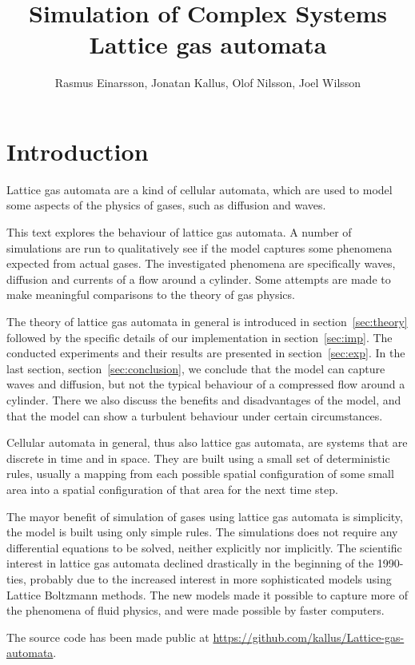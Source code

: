 \documentclass[12pt,a4paper]{article}
\author{Rasmus Einarsson, Jonatan Kallus, Olof Nilsson, Joel Wilsson}
\title{Simulation of Complex Systems\\Lattice gas automata}
\begin{document}
\maketitle

\section{Introduction}
Lattice gas automata are a kind of cellular automata, which are used to model some aspects of the physics of gases, such as diffusion and waves.

This text explores the behaviour of lattice gas automata. A number of simulations are run to qualitatively see if the model captures some phenomena expected from actual gases. The investigated phenomena are specifically waves, diffusion and currents of a flow around a cylinder. Some attempts are made to make meaningful comparisons to the theory of gas physics.


The theory of lattice gas automata in general is introduced in section~\ref{sec:theory} followed by the specific details of our implementation in section~\ref{sec:imp}. The conducted experiments and their results are presented in section~\ref{sec:exp}. In the last section, section~\ref{sec:conclusion}, we conclude that the model can capture waves and diffusion, but not the typical behaviour of a compressed flow around a cylinder. There we also discuss the benefits and disadvantages of the model, and that the model can show a turbulent behaviour under certain circumstances.

Cellular automata in general, thus also lattice gas automata, are systems that are discrete in time and in space. They are built using a small set of deterministic rules, usually a mapping from each possible spatial configuration of some small area into a spatial configuration of that area for the next time step.

The mayor benefit of simulation of gases using lattice gas automata is simplicity, the model is built using only simple rules. The simulations does not require any differential equations to be solved, neither explicitly nor implicitly. The scientific interest in lattice gas automata declined drastically in the beginning of the 1990-ties, probably due to the increased interest in more sophisticated models using Lattice Boltzmann methods. The new models made it possible to capture more of the phenomena of fluid physics, and were made possible by faster computers.

The source code has been made public at \url{https://github.com/kallus/Lattice-gas-automata}.
\end{document}
